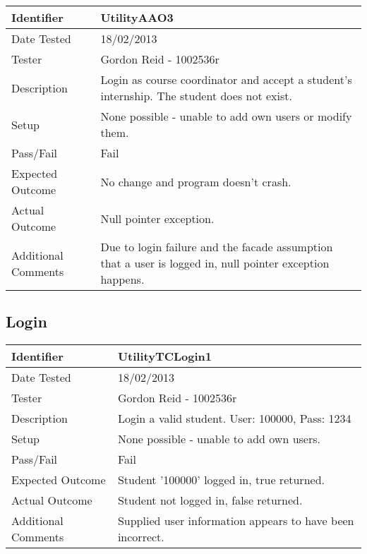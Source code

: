\documentclass[11pt]{l3deliverable}
\begin{document}
\begin{tabularx}{\textwidth}{|T|L|}
\hline
Identifier & UtilityAAO3\\
\hline
Date Tested & 18/02/2013\\
\hline
Tester & Gordon Reid - 1002536r\\
\hline
Description & Login as course coordinator and accept a student's internship.
The student does not exist.\\
\hline
Setup & None possible - unable to add own users or modify them.\\
\hline
Pass/Fail & Fail\\
\hline
Expected Outcome & No change and program doesn't crash.\\
\hline
Actual Outcome & Null pointer exception.\\
\hline
Additional Comments & Due to login failure and the facade assumption that a
user is logged in, null pointer exception happens.\\
\hline
\end{tabularx}

\subsection{Login}

\begin{tabularx}{\textwidth}{|T|L|}
\hline
Identifier & UtilityTCLogin1\\
\hline
Date Tested & 18/02/2013\\
\hline
Tester & Gordon Reid - 1002536r\\
\hline
Description & Login a valid student. User: 100000, Pass: 1234\\
\hline
Setup & None possible - unable to add own users.\\
\hline
Pass/Fail & Fail\\
\hline
Expected Outcome & Student '100000' logged in, true returned.\\
\hline
Actual Outcome & Student not logged in, false returned.\\
\hline
Additional Comments & Supplied user information appears to have been 
incorrect.\\
\hline
\end{tabularx}

\vspace{2em}
\end{document}
